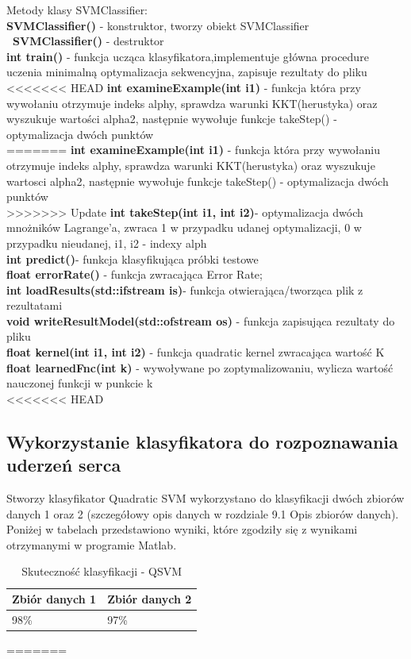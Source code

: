 \documentclass[[10pt,a4paper]{article}
\begin{document}
\begin{enumerate}
\begin{itemize}
Metody klasy SVMClassifier:\\
\textbf{SVMClassifier()} - konstruktor, tworzy obiekt SVMClassifier\\
\textbf{~SVMClassifier()} - destruktor\\
\textbf{int train() }- funkcja ucząca klasyfikatora,implementuje główna procedure uczenia minimalną optymalizacja sekwencyjna, zapisuje rezultaty do pliku\\
<<<<<<< HEAD
\textbf{int examineExample(int i1) }- funkcja która przy wywołaniu otrzymuje indeks alphy, sprawdza warunki KKT(herustyka) oraz wyszukuje wartości alpha2, następnie wywołuje funkcje takeStep() - optymalizacja dwóch punktów\\
=======
\textbf{int examineExample(int i1) }- funkcja która przy wywołaniu otrzymuje indeks alphy, sprawdza warunki KKT(herustyka) oraz wyszukuje wartosci alpha2, następnie wywołuje funkcje takeStep() - optymalizacja dwóch punktów\\
>>>>>>> Update
\textbf{int takeStep(int i1, int i2)}- optymalizacja dwóch mnożników Lagrange'a, zwraca 1 w przypadku udanej optymalizacji, 0 w przypadku nieudanej, i1, i2 - indexy alph\\
\textbf{int predict()}- funkcja klasyfikująca próbki testowe\\
\textbf{float errorRate()} - funkcja zwracająca Error Rate;\\
\textbf{int loadResults(std::ifstream is)}- funkcja otwierająca/tworząca plik z rezultatami \\
\textbf{void writeResultModel(std::ofstream os)} - funkcja zapisująca rezultaty do pliku\\
\textbf{float kernel(int i1, int i2)} - funkcja quadratic kernel zwracająca wartość K\\
\textbf{float learnedFnc(int k)} - wywoływane po zoptymalizowaniu, wylicza wartość nauczonej funkcji w punkcie k\\


<<<<<<< HEAD
\subsection{Wykorzystanie klasyfikatora do rozpoznawania uderzeń serca}

Stworzy klasyfikator Quadratic SVM wykorzystano do klasyfikacji dwóch zbiorów danych 1 oraz 2 (szczegółowy opis danych w rozdziale 9.1 Opis zbiorów danych). Poniżej w tabelach przedstawiono wyniki, które zgodziły się z wynikami otrzymanymi w programie Matlab.
\begin{table}[h]
\centering
\caption{Skuteczność klasyfikacji - QSVM}
\label{Table}
\begin{tabular}{|l|l|}
\hline
Zbiór danych 1 & Zbiór danych 2 \\ \hline
  98\%   &  97\% \\ \hline
\end{tabular}
\end{table}
=======

\end{itemize}
\end{enumerate}
\end{document}

